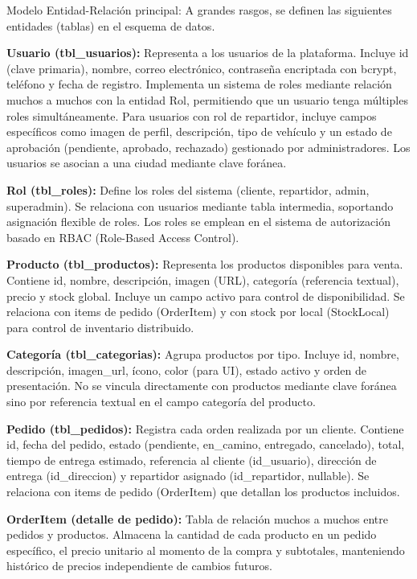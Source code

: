   Modelo Entidad-Relación principal: A grandes rasgos, se definen las siguientes entidades (tablas) en el esquema de datos.

  \textbf{Usuario (tbl\_usuarios):} Representa a los usuarios de la plataforma. Incluye id (clave primaria), nombre, correo electrónico, contraseña encriptada con bcrypt, teléfono y fecha de registro. Implementa un sistema de roles mediante relación muchos a muchos con la entidad Rol, permitiendo que un usuario tenga múltiples roles simultáneamente. Para usuarios con rol de repartidor, incluye campos específicos como imagen de perfil, descripción, tipo de vehículo y un estado de aprobación (pendiente, aprobado, rechazado) gestionado por administradores. Los usuarios se asocian a una ciudad mediante clave foránea.

  \textbf{Rol (tbl\_roles):} Define los roles del sistema (cliente, repartidor, admin, superadmin). Se relaciona con usuarios mediante tabla intermedia, soportando asignación flexible de roles. Los roles se emplean en el sistema de autorización basado en RBAC (Role-Based Access Control).

  \textbf{Producto (tbl\_productos):} Representa los productos disponibles para venta. Contiene id, nombre, descripción, imagen (URL), categoría (referencia textual), precio y stock global. Incluye un campo activo para control de disponibilidad. Se relaciona con items de pedido (OrderItem) y con stock por local (StockLocal) para control de inventario distribuido.

  \textbf{Categoría (tbl\_categorias):} Agrupa productos por tipo. Incluye id, nombre, descripción, imagen\_url, ícono, color (para UI), estado activo y orden de presentación. No se vincula directamente con productos mediante clave foránea sino por referencia textual en el campo categoría del producto.

  \textbf{Pedido (tbl\_pedidos):} Registra cada orden realizada por un cliente. Contiene id, fecha del pedido, estado (pendiente, en\_camino, entregado, cancelado), total, tiempo de entrega estimado, referencia al cliente (id\_usuario), dirección de entrega (id\_direccion) y repartidor asignado (id\_repartidor, nullable). Se relaciona con items de pedido (OrderItem) que detallan los productos incluidos.

  \textbf{OrderItem (detalle de pedido):} Tabla de relación muchos a muchos entre pedidos y productos. Almacena la cantidad de cada producto en un pedido específico, el precio unitario al momento de la compra y subtotales, manteniendo histórico de precios independiente de cambios futuros.

